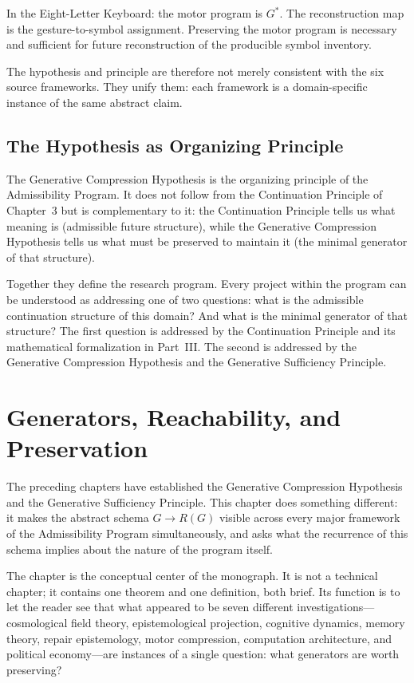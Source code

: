 \documentclass[12pt, oneside]{book}
\theoremstyle{flyxion}
\theoremstyle{definition}
\begin{document}
In the Eight-Letter Keyboard: the motor program is $G^*$.
The reconstruction map is the gesture-to-symbol assignment.
Preserving the motor program is necessary and sufficient
for future reconstruction of the producible symbol inventory.

The hypothesis and principle are therefore not merely
consistent with the six source frameworks. They unify them:
each framework is a domain-specific instance of the same
abstract claim.

\section{The Hypothesis as Organizing Principle}

The Generative Compression Hypothesis is the organizing
principle of the Admissibility Program. It does not follow
from the Continuation Principle of Chapter~3 but is
complementary to it: the Continuation Principle tells us
what meaning is (admissible future structure), while the
Generative Compression Hypothesis tells us what must be
preserved to maintain it (the minimal generator of that
structure).

Together they define the research program. Every project
within the program can be understood as addressing one of
two questions: what is the admissible continuation structure
of this domain? And what is the minimal generator of that
structure? The first question is addressed by the Continuation
Principle and its mathematical formalization in Part~III.
The second is addressed by the Generative Compression
Hypothesis and the Generative Sufficiency Principle.

\chapter{Generators, Reachability, and Preservation}

The preceding chapters have established the Generative
Compression Hypothesis and the Generative Sufficiency
Principle. This chapter does something different: it makes
the abstract schema $G \to R(G)$ visible across every
major framework of the Admissibility Program simultaneously,
and asks what the recurrence of this schema implies about
the nature of the program itself.

The chapter is the conceptual center of the monograph. It
is not a technical chapter; it contains one theorem and
one definition, both brief. Its function is to let the
reader see that what appeared to be seven different
investigations---cosmological field theory, epistemological
projection, cognitive dynamics, memory theory, repair
epistemology, motor compression, computation architecture,
and political economy---are instances of a single question:
what generators are worth preserving?
\end{document}
